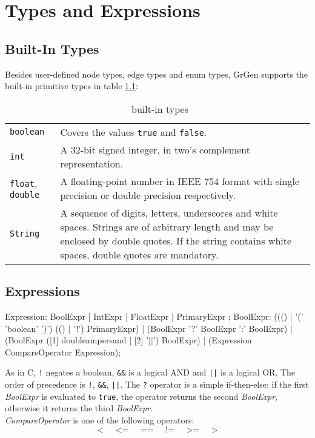 \chapter{Types and Expressions}
\label{expressions}

\section{Built-In Types}
Besides user-defined node types, edge types and enum types, GrGen supports the built-in primitive types in table \ref{builtintypes}:
\begin{table}[htbp]
\begin{tabularx}{\linewidth}{|l|X|}\hline
	\texttt{boolean} & Covers the values \texttt{true} and \texttt{false}. \\
	\texttt{int} & A 32-bit signed integer, in two's complement representation. \\
	\texttt{float}, \texttt{double} & A floating-point number in IEEE 754 format with single precision or double precision respectively. \\
	\texttt{String} & A sequence of digits, letters, underscores and white spaces. Strings are of arbitrary length and may be enclosed by double quotes. If the string contains white spaces, double quotes are mandatory.\\ \hline
\end{tabularx}
\caption{\GrG\ built-in types}
\label{builtintypes}
\end{table}

\section{Expressions}
\begin{rail}
  Expression: BoolExpr | IntExpr | FloatExpr | PrimaryExpr ;  
  BoolExpr: ((() | '(' 'boolean' ')') (() | '!') PrimaryExpr) | (BoolExpr '?' BoolExpr ':' BoolExpr) | (BoolExpr ([1] doubleampersand | [2] '||') BoolExpr) | (Expression CompareOperator Expression);
\end{rail}
As in C, \texttt{!} negates a boolean, \texttt{\&\&} is a logical AND and \texttt{||} is a logical OR. The order of precedence is \texttt{!}, \texttt{\&\&}, \texttt{||}. The \texttt{?} operator is a simple if-then-else: if the first \emph{BoolExpr} is evaluated to \texttt{true}, the operator returns the second \emph{BoolExpr}, otherwise it returns the third \emph{BoolExpr}.\\
\emph{CompareOperator} is one of the following operators:
\[ \texttt{<} \;\;\;\;\; \texttt{<=} \;\;\;\;\; \texttt{==} \;\;\;\;\; \texttt{!=} \;\;\;\;\; \texttt{>=} \;\;\;\;\; \texttt{>} \]

